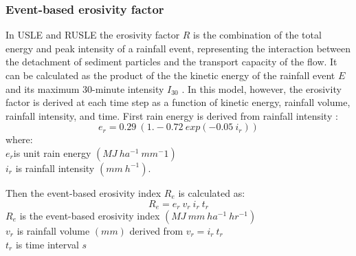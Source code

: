 \documentclass[final,3p,times,twocolumn]{elsarticle}
\begin{document}
\subsubsection{Event-based erosivity factor} 
In USLE and RUSLE the erosivity factor $R$ %
is the combination of the total energy and peak intensity of a rainfall event,
representing the interaction between the detachment of sediment particles
and the transport capacity of the flow. 
It can be calculated as the product of the 
the kinetic energy of the rainfall event $E$
and its maximum 30-minute intensity $I_{30}$
\cite{Brown1987,Renard1997}.
%
In this model, however, the erosivity factor
is derived at each time step as a function of
kinetic energy, rainfall volume, rainfall intensity, and time.
%
First rain energy is derived from rainfall intensity \cite{Brown1987}:
\begin{equation}
\label{eq:rain_energy}
{e_r = 0.29 ~ (1.-0.72 ~ exp(-0.05 ~ i_r))}
\end{equation}
%
{\small
\noindent
where: \\
\noindent
\hspace*{0.5em} $e_r$is unit rain energy $(MJ ~ ha^{-1} ~ mm{^-1})$\\
\hspace*{0.5em} $i_r$ is rainfall intensity $(mm ~ h^{-1})$.\\
}

\noindent
Then the event-based erosivity index $R_e$ is calculated as:
\begin{equation}
\label{eq:erosivity_index}
{R_e = e_r ~ v_r ~ i_r ~ t_r}
\end{equation}
%
{\small
\noindent
\hspace*{0.5em} $R_e$ is the event-based erosivity index $(MJ ~ mm ~ ha^{-1} ~ hr^{-1})$\\
\hspace*{0.5em} $v_r$ is rainfall volume $(mm)$ derived from ${v_r = i_r ~ t_r}$\\
\hspace*{0.5em} $t_r$ is time interval $s$\\ 
}
\end{document}
